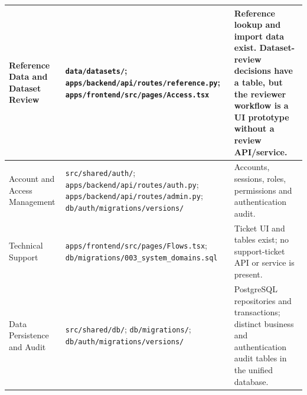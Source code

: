 \documentclass[10pt,letterpaper]{article}
\newenvironment{updated}{\par\color{pafourblue}}{\par}
\newcommand{\sourcefile}[1]{\nolinkurl{#1}}
\begin{document}
\begin{updated}
\begin{longtable}{|L{0.265\textwidth}|L{0.325\textwidth}|L{0.32\textwidth}|}
Reference Data and Dataset Review & \sourcefile{data/datasets/}; \sourcefile{apps/backend/api/routes/reference.py}; \sourcefile{apps/frontend/src/pages/Access.tsx} & Reference lookup and import data exist. Dataset-review decisions have a table, but the reviewer workflow is a UI prototype without a review API/service. \\ \hline
Account and Access Management & \sourcefile{src/shared/auth/}; \sourcefile{apps/backend/api/routes/auth.py}; \sourcefile{apps/backend/api/routes/admin.py}; \sourcefile{db/auth/migrations/versions/} & Accounts, sessions, roles, permissions and authentication audit. \\ \hline
Technical Support & \sourcefile{apps/frontend/src/pages/Flows.tsx}; \sourcefile{db/migrations/003_system_domains.sql} & Ticket UI and tables exist; no support-ticket API or service is present. \\ \hline
Data Persistence and Audit & \sourcefile{src/shared/db/}; \sourcefile{db/migrations/}; \sourcefile{db/auth/migrations/versions/} & PostgreSQL repositories and transactions; distinct business and authentication audit tables in the unified database. \\ \hline
\end{longtable}
\endgroup
\end{updated}
\end{document}
